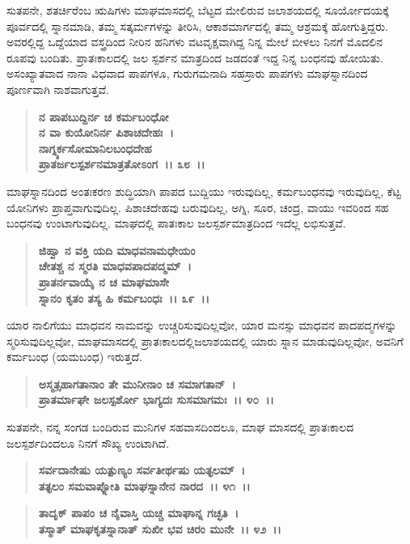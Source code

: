 ಸುತಪನೇ, ಶತರ್ಚಿರೆಂಬ ಋಷಿಗಳು ಮಾಘಮಾಸದಲ್ಲಿ ಬೆಟ್ಟದ ಮೇಲಿರುವ ಜಲಾಶಯದಲ್ಲಿ ಸೂರ್ಯೋದಯಕ್ಕೆ ಪೂರ್ವದಲ್ಲಿ ಸ್ನಾನಮಾಡಿ, ತಮ್ಮ ಸತ್ಕರ್ಮಗಳನ್ನು ತೀರಿಸಿ, ಆಕಾಶಮಾರ್ಗದಲ್ಲಿ ತಮ್ಮ ಆಶ್ರಮಕ್ಕೆ ಹೋಗುತ್ತಿದ್ದರು. ಅವರಲ್ಲಿದ್ದ ಒದ್ದೆಯಾದ ವಸ್ತ್ರದಿಂದ ನೀರಿನ ಹನಿಗಳು ವಟವೃಕ್ಷವಾಗಿದ್ದ ನಿನ್ನ ಮೇಲೆ ಬೀಳಲು ನಿನಗೆ ಮೊದಲಿನ ರೂಪವು ಬಂದಿತು. ಪ್ರಾತಃಕಾಲದಲ್ಲಿ ಜಲ ಸ್ಪರ್ಶನ ಮಾತ್ರದಿಂದ ಜಡದಂತೆ ಇದ್ದ ನಿನ್ನ ಬಂಧನವು ಹೋಯಿತು. ಅಸಂಖ್ಯಾತವಾದ ನಾನಾ ವಿಧವಾದ ಪಾಪಗಳೂ, ಗುರುಗಮನಾದಿ ಸಹಸ್ರಾರು ಪಾಪಗಳು ಮಾಘಸ್ನಾನದಿಂದ ಪೂರ್ಣವಾಗಿ ನಾಶವಾಗುತ್ತವೆ.

\begin{verse}
\textbf{ನ ಪಾಪಬುದ್ದಿರ್ನ ಚ ಕರ್ಮಬಂಧೋ}\\\textbf{ನ ವಾ ಕುಯೋನಿರ್ನ ಪಿಶಾಚದೇಹಃ~। }\\\textbf{ನಾಗ್ನ್ಯರ್ಕಸೋಮಾನಿಲಬಂಧದೇಹ} \\\textbf{ಪ್ರಾತರ್ಜಲಸ್ಪರ್ಶನಮಾತ್ರತೋಽಂಗ~।। ೩೮~।।}
\end{verse}

ಮಾಘಸ್ನಾನದಿಂದ ಅಂತಃಕರಣ ಶುದ್ಧಿಯಾಗಿ ಪಾಪದ ಬುದ್ದಿಯು ಇರುವುದಿಲ್ಲ, ಕರ್ಮಬಂಧನವು ಇರುವುದಿಲ್ಲ, ಕೆಟ್ಟ ಯೋನಿಗಳು ಪ್ರಾಪ್ತವಾಗುವುದಿಲ್ಲ. ಪಿಶಾಚದೇಹವು ಬರುವುದಿಲ್ಲ, ಅಗ್ನಿ, ಸೂರ, ಚಂದ್ರ, ವಾಯು ಇವರಿಂದ ಸಹ ಬಂಧನವು ಉಂಟಾಗುವುದಿಲ್ಲ. ಮಾಘದಲ್ಲಿ ಪಾತಃಕಾಲ ಜಲಸ್ಪರ್ಶಮಾತ್ರದಿಂದ ಇದೆಲ್ಲ ಲಭಿಸುತ್ತವೆ.

\begin{verse}
\textbf{ಜಿಹ್ವಾ ನ ವಕ್ತಿ ಯದಿ ಮಾಧವನಾಮಧೇಯಂ}\\\textbf{ಚೇತಶ್ಚ ನ ಸ್ಮರತಿ ಮಾಧವಪಾದಪದ್ಮಮ್~। }\\\textbf{ಪ್ರಾತರ್ನವಾಯೈ ನ ಚ ಮಾಘಮಾಸೇ} \\\textbf{ಸ್ನಾನಂ ಕೃತಂ ತಸ್ಯ ಹಿ ಕರ್ಮಬಂಧಃ~।। ೩೯~।।}
\end{verse}

ಯಾರ ನಾಲಿಗೆಯು ಮಾಧವನ ನಾಮವನ್ನು ಉಚ್ಚರಿಸುವುದಿಲ್ಲವೋ, ಯಾರ ಮನಸ್ಸು ಮಾಧವನ ಪಾದಪದ್ಮಗಳನ್ನು ಸ್ಮರಿಸುವುದಿಲ್ಲವೋ, ಮಾಘಮಾಸದಲ್ಲಿ ಪ್ರಾತಃಕಾಲದಲ್ಲಿ\break ಜಲಾಶಯದಲ್ಲಿ ಯಾರು ಸ್ನಾನ ಮಾಡುವುದಿಲ್ಲವೋ, ಅವನಿಗೆ ಕರ್ಮಬಂಧ (ಯಮಬಂಧ) ಇರುತ್ತದೆ.

\begin{verse}
\textbf{ಅಸ್ಮತ್ಸಹಾಗತಾನಾಂ ತೇ ಮುನೀನಾಂ ಚ ಸಮಾಗತಾನ್~।}\\\textbf{ಪ್ರಾತರ್ಮಾಘೇ ಜಲಸ್ಪರ್ಶೋ ಭಾಗ್ಯದಃ ಸುಸಮಾಗಮಃ~।। ೪೦~।।}
\end{verse}

ಸುತಪನೇ, ನನ್ನ ಸಂಗಡ ಬಂದಿರುವ ಮುನಿಗಳ ಸಹವಾಸದಿಂದಲೂ, ಮಾಘ ಮಾಸದಲ್ಲಿ ಪ್ರಾತಃಕಾಲದ ಜಲಸ್ಪರ್ಶದಿಂದಲೂ ನಿನಗೆ ಸೌಖ್ಯ ಉಂಟಾಗಿದೆ.

\begin{verse}
\textbf{ಸರ್ವದಾನೇಷು ಯತ್ಪುಣ್ಯಂ ಸರ್ವತೀರ್ಥಷು ಯತ್ಫಲಮ್~।}\\\textbf{ತತ್ಫಲಂ ಸಮವಾಪ್ನೋತಿ ಮಾಘಸ್ನಾನೇನ ನಾರದ~।। ೪೧~।। }
\end{verse}

\begin{verse}
\textbf{ತಾದೃಕ್ ಪಾಪಂ ಚ ನೈವಾಸ್ತಿ ಯಚ್ಚ ಮಾಘಾನ್ನ ಗಚ್ಛತಿ~।}\\\textbf{ತಸ್ಮಾತ್ ಮಾಘಕೃತಸ್ನಾನಾತ್ ಸುಖೀ ಭವ ಚಿರಂ ಮುನೇ~।। ೪೨~।।}
\end{verse}

